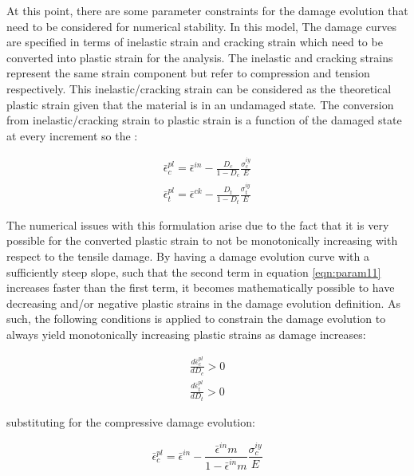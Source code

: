 At this point, there are some parameter constraints for the damage evolution that need to be considered for numerical stability. In this model, The damage curves are specified in terms of inelastic strain and cracking strain which need to be converted into plastic strain for the analysis. The inelastic and cracking strains represent the same strain component but refer to compression and tension respectively. This inelastic/cracking strain can be considered as the theoretical plastic strain given that the material is in an undamaged state. The conversion from inelastic/cracking strain to plastic strain is a function of the damaged state at every increment so the :

\begin{equation}
\label{eqn:param11}
\begin{array}{c}
\bar{\epsilon}_{c}^{pl}=\bar{\epsilon}^{in}-\frac{D_{c}}{1-D_{c}}\frac{\sigma_{c}^{iy}}{E}\\
\bar{\epsilon}_{t}^{pl}=\bar{\epsilon}^{ck}-\frac{D_{t}}{1-D_{t}}\frac{\sigma_{t}^{iy}}{E}
\end{array}
\end{equation}


The numerical issues with this formulation arise due to the fact that it is very possible for the converted plastic strain to not be monotonically increasing with respect to the tensile damage. By having a damage evolution curve with a sufficiently steep slope, such that the second term in equation \ref{eqn:param11} increases faster than the first term, it becomes mathematically possible to have decreasing and/or negative plastic strains in the damage evolution definition. As such, the following conditions is applied to constrain the damage evolution to always yield monotonically increasing plastic strains as damage increases:

\begin{equation}
\begin{array}{c}
\frac{d\bar{\epsilon}_{c}^{pl}}{dD_{c}}>0\label{eqn:param6-1}\\
\frac{d\bar{\epsilon}_{t}^{pl}}{dD_{t}}>0\label{eqn:param6-1}
\end{array}
\end{equation}


substituting for the compressive damage evolution:

\begin{equation}
\bar{\epsilon}_{c}^{pl}=\bar{\epsilon}^{in}-\frac{\bar{\epsilon}^{in}m}{1-\bar{\epsilon}^{in}m}\frac{\sigma_{c}^{iy}}{E}\label{eqn:param12}
\end{equation}


